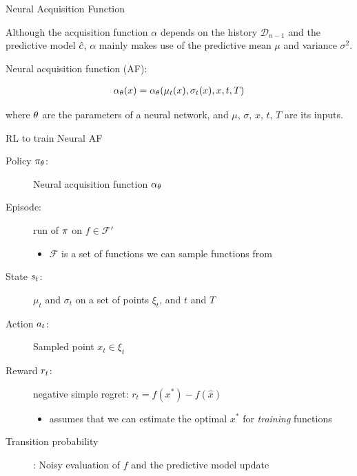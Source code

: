 \begin{frame}[c]{Neural Acquisition Function  }

Although the \alert{acquisition function $\alpha$} depends on the history $\mathcal{D}_{n-1}$ and the predictive model $\hat{c}$, $\alpha$ mainly makes use of the \alert{predictive mean $\mu$ and variance $\sigma^2$}.

\pause
\bigskip

Neural acquisition function (AF):

\begin{eqnarray}
\alpha_\theta(x) = \alpha_\theta(\mu_t(x), \sigma_t(x), x, t, T) \nonumber
\end{eqnarray}

where $\theta$ are the parameters of a neural network, and $\mu$, $\sigma$, $x$, $t$, $T$ are its inputs.


\end{frame}
\begin{frame}[c]{RL to train Neural AF }

\begin{description}
\item[Policy $\pi_\theta$:] Neural acquisition function $\alpha_\theta$
\pause
\item[Episode:] run of $\pi$ on $f\in \mathcal{F}'$
\begin{itemize}
\item $\mathcal{F}$ is a set of functions we can sample functions from
\end{itemize}
\pause
\item[State $s_t$:] $\mu_t$ and $\sigma_t$ on a set of points $\xi_t$, and $t$ and $T$
\pause
\item[Action $a_t$:] Sampled point $x_t \in \xi_t$
\pause
\item[Reward $r_t$:] negative simple regret: $r_t = f(x^*) - f(\hat{x})$
\begin{itemize}
\item assumes that we can estimate the optimal $x^*$ for \emph{training} functions
\end{itemize}
\pause
\item[Transition probability]: Noisy evaluation of $f$ and the predictive model update
\end{description}

\end{frame}
